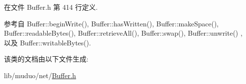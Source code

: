 在文件 Buffer.\+h 第 414 行定义.



参考自 Buffer\+::begin\+Write(), Buffer\+::has\+Written(), Buffer\+::make\+Space(), Buffer\+::readable\+Bytes(), Buffer\+::retrieve\+All(), Buffer\+::swap(), Buffer\+::unwrite() , 以及 Buffer\+::writable\+Bytes().



该类的文档由以下文件生成\+:\begin{DoxyCompactItemize}
\item 
lib/muduo/net/\hyperlink{muduo_2net_2Buffer_8h}{Buffer.\+h}\end{DoxyCompactItemize}
